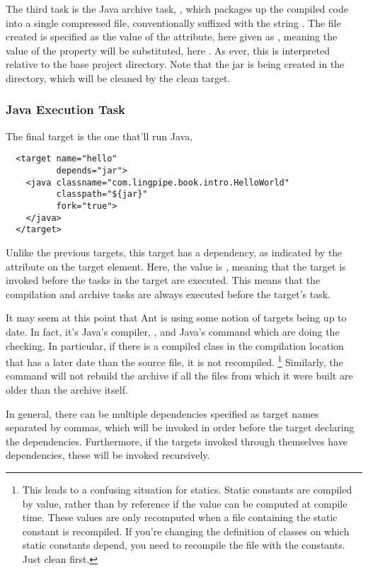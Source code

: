 The third task is the Java archive task, , which packages up
the compiled code into a single compressed file, conventionally
suffixed with the string .  The file created is specified
as the value of the  attribute, here given as
, meaning the value of the  property will be
substituted, here .  As ever, this is
interpreted relative to the base project directory.  Note that the jar
is being created in the  directory, which will be cleaned
by the clean target.  

\subsubsection{Java Execution Task}

The final target is the one that'll run Java,

\begin{verbatim}
  <target name="hello"
          depends="jar">
    <java classname="com.lingpipe.book.intro.HelloWorld"
          classpath="${jar}"
          fork="true">
    </java>
  </target>
\end{verbatim}
%
Unlike the previous targets, this target has a dependency, as
indicated by the  attribute on the target element.
Here, the value is , meaning that the  target is
invoked before the tasks in the  target are executed.
This means that the compilation and archive tasks are always executed
before the  target's task.  

It may seem at this point that Ant is using some notion of targets
being up to date.  In fact, it's Java's compiler, , and
Java's  command which are doing the checking.  In
particular, if there is a compiled class in the compilation location
that has a later date than the source file, it is not recompiled.%
%
\footnote{This leads to a confusing situation for statics.  Static
constants are compiled by value, rather than by reference if the value
can be computed at compile time.  These values are only recomputed
when a file containing the static constant is recompiled.  If you're
changing the definition of classes on which static constants depend,
you need to recompile the file with the constants.  Just clean first.}
%
Similarly, the  command will not rebuild the archive if
all the files from which it were built are older than the archive
itself.

In general, there can be multiple dependencies specified as target
names separated by commas, which will be invoked in order before the
target declaring the dependencies.  Furthermore, if the targets
invoked through  themselves have dependencies, these
will be invoked recursively.

